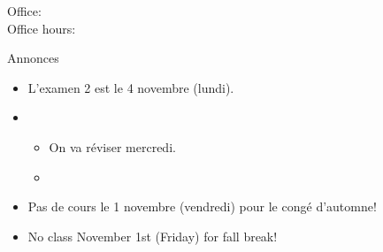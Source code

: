 \documentclass{beamer}
\subtitle[Couleurs, comparatifs, superlatifs]{Les couleurs, les comparatifs et les superlatifs des adjectifs}
\begin{document}
  \begin{frame}
    \titlepage
    \tiny{Office: \\
          Office hours: }
  \end{frame}

  \begin{frame}{Annonces }
    \begin{itemize}
      \item L'examen 2 est le 4 novembre (lundi).
      \item[] 
      \begin{itemize}
        \item On va réviser mercredi.
        \item[] 
      \end{itemize}
      \item Pas de cours le 1 novembre (vendredi) pour le congé d'automne!
      \item[] No class November 1st (Friday) for fall break!
    \end{itemize}
  \end{frame}

\end{document}
